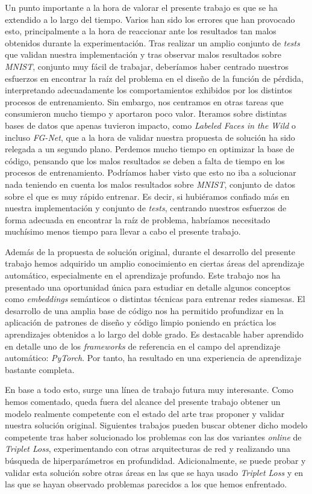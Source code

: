 Un punto importante a la hora de valorar el presente trabajo es que se ha extendido a lo largo del tiempo. Varios han sido los errores que han provocado esto, principalmente a la hora de reaccionar ante los resultados tan malos obtenidos durante la experimentación. Tras realizar un amplio conjunto de \textit{tests} que validan nuestra implementación y tras observar malos resultados sobre \textit{MNIST}, conjunto muy fácil de trabajar, deberíamos haber centrado nuestros esfuerzos en encontrar la raíz del problema en el diseño de la función de pérdida, interpretando adecuadamente los comportamientos exhibidos por los distintos procesos de entrenamiento. Sin embargo, nos centramos en otras tareas que consumieron mucho tiempo y aportaron poco valor. Iteramos sobre distintas bases de datos que apenas tuvieron impacto, como \textit{Labeled Faces in the Wild} o incluso \textit{FG-Net}, que a la hora de validar nuestra propuesta de solución ha sido relegada a un segundo plano. Perdemos mucho tiempo en optimizar la base de código, pensando que los malos resultados se deben a falta de tiempo en los procesos de entrenamiento. Podríamos haber visto que esto no iba a solucionar nada teniendo en cuenta los malos resultados sobre \textit{MNIST}, conjunto de datos sobre el que es muy rápido entrenar. Es decir, si hubiéramos confiado más en nuestra implementación y conjunto de \textit{tests}, centrando nuestros esfuerzos de forma adecuada en encontrar la raíz de problema, habríamos necesitado muchísimo menos tiempo para llevar a cabo el presente trabajo.

Además de la propuesta de solución original, durante el desarrollo del presente trabajo hemos adquirido un amplio conocimiento en ciertas áreas del aprendizaje automático, especialmente en el aprendizaje profundo. Este trabajo nos ha presentado una oportunidad única para estudiar en detalle algunos conceptos como \textit{embeddings} semánticos o distintas técnicas para entrenar redes siamesas. El desarrollo de una amplia base de código nos ha permitido profundizar en la aplicación de patrones de diseño y código limpio poniendo en práctica los aprendizajes obtenidos a lo largo del doble grado. Es destacable haber aprendido en detalle uno de los \textit{frameworks} de referencia en el campo del aprendizaje automático: \textit{PyTorch}. Por tanto, ha resultado en una experiencia de aprendizaje bastante completa.

En base a todo esto, surge una línea de trabajo futura muy interesante. Como hemos comentado, queda fuera del alcance del presente trabajo obtener un modelo realmente competente con el estado del arte tras proponer y validar nuestra solución original. Siguientes trabajos pueden buscar obtener dicho modelo competente tras haber solucionado los problemas con las dos variantes \textit{online} de \textit{Triplet Loss}, experimentando con otras arquitecturas de red y realizando una búsqueda de hiperparámetros en profundidad.
Adicionalmente, se puede probar y validar esta solución sobre otras áreas en las que se haya usado \textit{Triplet Loss} y en las que se hayan observado problemas parecidos a los que hemos enfrentado.

